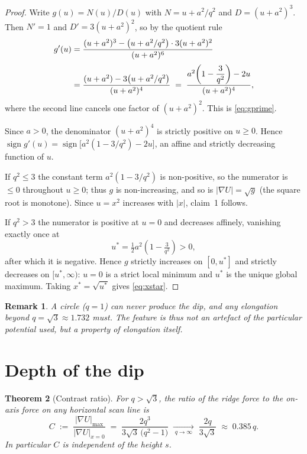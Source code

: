 \documentclass[11pt]{article}
\newtheorem{theorem}{Theorem}
\newtheorem{remark}[theorem]{Remark}
\begin{document}
\begin{proof}
Write $g(u)=N(u)/D(u)$ with $N=u+a^{2}/q^{2}$ and $D=(u+a^{2})^{3}$. Then
$N'=1$ and $D'=3(u+a^{2})^{2}$, so by the quotient rule
\begin{align}
  g'(u)
  &=\frac{(u+a^{2})^{3}-\bigl(u+a^{2}/q^{2}\bigr)\cdot 3(u+a^{2})^{2}}
         {(u+a^{2})^{6}} \notag\\[2pt]
  &=\frac{(u+a^{2})-3\bigl(u+a^{2}/q^{2}\bigr)}{(u+a^{2})^{4}}
   \;=\;\frac{a^{2}\!\left(1-\dfrac{3}{q^{2}}\right)-2u}{(u+a^{2})^{4}} ,
\end{align}
where the second line cancels one factor of $(u+a^{2})^{2}$. This is
\eqref{eq:gprime}.

Since $a>0$, the denominator $(u+a^{2})^{4}$ is strictly positive on
$u\ge 0$. Hence $\operatorname{sign} g'(u)=\operatorname{sign}\bigl[
a^{2}(1-3/q^{2})-2u\bigr]$, an affine and strictly decreasing function of $u$.

If $q^{2}\le 3$ the constant term $a^{2}(1-3/q^{2})$ is non-positive, so the
numerator is $\le 0$ throughout $u\ge0$; thus $g$ is non-increasing, and so is
$|\nabla U|=\sqrt{g}$ (the square root is monotone). Since $u=x^{2}$ increases
with $|x|$, claim~1 follows.

If $q^{2}>3$ the numerator is positive at $u=0$ and decreases affinely,
vanishing exactly once at
\begin{equation}
  u^{*}=\tfrac{1}{2}a^{2}\!\left(1-\tfrac{3}{q^{2}}\right)>0 ,
  \label{eq:ustar}
\end{equation}
after which it is negative. Hence $g$ strictly increases on $[0,u^{*}]$ and
strictly decreases on $[u^{*},\infty)$: $u=0$ is a strict local minimum and
$u^{*}$ is the unique global maximum. Taking $x^{*}=\sqrt{u^{*}}$ gives
\eqref{eq:xstar}.
\end{proof}

\begin{remark}
A circle ($q=1$) can never produce the dip, and any elongation beyond
$q=\sqrt{3}\approx 1.732$ must. The feature is thus not an artefact of the
particular potential used, but a property of elongation itself.
\end{remark}

\section{Depth of the dip}

\begin{theorem}[Contrast ratio]
\label{thm:contrast}
For $q>\sqrt3$, the ratio of the ridge force to the on-axis force on any
horizontal scan line is
\begin{equation}
  C\;:=\;\frac{|\nabla U|_{\max}}{|\nabla U|_{x=0}}
  \;=\;\frac{2q^{3}}{3\sqrt{3}\,\bigl(q^{2}-1\bigr)}
  \;\xrightarrow[\;q\to\infty\;]{}\;\frac{2q}{3\sqrt{3}}\;\approx\;0.385\,q .
  \label{eq:contrast}
\end{equation}
In particular $C$ is independent of the height $s$.
\end{theorem}
\end{document}
